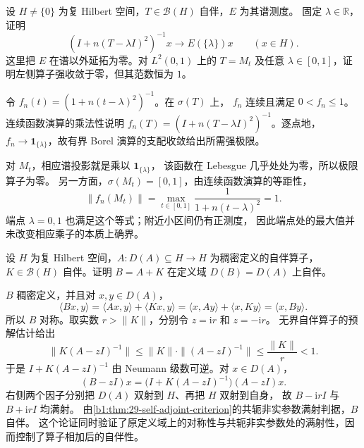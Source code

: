 \begin{optionalexercise}\label{b1:ex:29-atom-approximation}
设 \(H\ne\{0\}\) 为复 Hilbert 空间，\(T\in\mathcal B(H)\) 自伴，\(E\) 为其谱测度。
固定 \(\lambda\in\mathbb R\)，证明
\[
 (I+n(T-\lambda I)^2)^{-1}x\longrightarrow E(\{\lambda\})x
 \qquad(x\in H).
\]
这里把 \(E\) 在谱以外延拓为零。对 \(L^2(0,1)\) 上的 \(T=M_t\)
及任意 \(\lambda\in[0,1]\)，证明左侧算子强收敛于零，但其范数恒为 \(1\)。
\end{optionalexercise}
\begin{solution}
令 \(f_n(t)=(1+n(t-\lambda)^2)^{-1}\)。在 \(\sigma(T)\) 上，
\(f_n\) 连续且满足 \(0<f_n\leq1\)。连续函数演算的乘法性说明
\(f_n(T)=(I+n(T-\lambda I)^2)^{-1}\)。逐点地，
\(f_n\to\mathbf1_{\{\lambda\}}\)，故有界 Borel 演算的支配收敛给出所需强极限。

对 \(M_t\)，相应谱投影就是乘以 \(\mathbf1_{\{\lambda\}}\)，
该函数在 Lebesgue 几乎处处为零，所以极限算子为零。
另一方面，\(\sigma(M_t)=[0,1]\)，由连续函数演算的等距性，
\[
 \|f_n(M_t)\|=\max_{t\in[0,1]}\frac1{1+n(t-\lambda)^2}=1.
\]
端点 \(\lambda=0,1\) 也满足这个等式；附近小区间仍有正测度，
因此端点处的最大值并未改变相应乘子的本质上确界。
\end{solution}

\begin{optionalexercise}\label{b1:ex:29-bounded-perturbation}
设 \(H\) 为复 Hilbert 空间，\(A:D(A)\subseteq H\to H\) 为稠密定义的自伴算子，
\(K\in\mathcal B(H)\) 自伴。证明 \(B=A+K\) 在定义域 \(D(B)=D(A)\) 上自伴。
\end{optionalexercise}
\begin{solution}
\(B\) 稠密定义，并且对 \(x,y\in D(A)\)，
\[
 \langle Bx,y\rangle
 =\langle Ax,y\rangle+\langle Kx,y\rangle
 =\langle x,Ay\rangle+\langle x,Ky\rangle
 =\langle x,By\rangle.
\]
所以 \(B\) 对称。取实数 \(r>\|K\|\)，分别令 \(z=\mathrm ir\) 和 \(z=-\mathrm ir\)。
无界自伴算子的预解估计给出
\[
 \|K(A-zI)^{-1}\|\leq\|K\|\cdot\|(A-zI)^{-1}\|
 \leq\frac{\|K\|}{r}<1.
\]
于是 \(I+K(A-zI)^{-1}\) 由 Neumann 级数可逆。对 \(x\in D(A)\)，
\[
 (B-zI)x=\bigl(I+K(A-zI)^{-1}\bigr)(A-zI)x.
\]
右侧两个因子分别把 \(D(A)\) 双射到 \(H\)、再把 \(H\) 双射到自身，
故 \(B-\mathrm irI\) 与 \(B+\mathrm irI\) 均满射。
由\cref{b1:thm:29-self-adjoint-criterion}的共轭非实参数满射判据，\(B\) 自伴。
这个论证同时验证了原定义域上的对称性与共轭非实参数处的满射性，因而控制了算子相加后的自伴性。
\end{solution}

